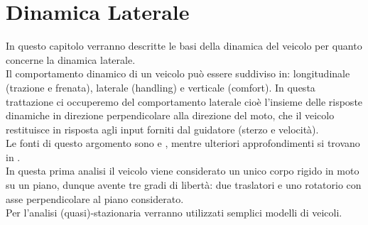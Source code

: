 \section{Dinamica Laterale} \label{Dinamica laterale}
In questo capitolo verranno descritte le basi della dinamica del veicolo per quanto concerne la dinamica laterale.\\
Il comportamento dinamico di un veicolo può essere suddiviso in: longitudinale (trazione
e frenata), laterale (handling) e verticale (comfort).
In questa trattazione ci occuperemo del comportamento laterale cioè l'insieme delle risposte dinamiche in direzione perpendicolare alla direzione del moto, che il veicolo restituisce in risposta agli input forniti dal guidatore (sterzo e velocità).\\
Le fonti di questo argomento sono \cite{Guiggiani} e \cite{limebeer2018dynamics}, mentre ulteriori approfondimenti si trovano in  \cite{pacejka2005tire}.\\



In questa prima analisi il veicolo viene considerato un unico corpo rigido in
moto su un piano, dunque avente tre gradi di libertà: due traslatori e uno
rotatorio con asse perpendicolare al piano considerato.\\ 
Per l'analisi (quasi)-stazionaria verranno utilizzati semplici modelli di veicoli. 


